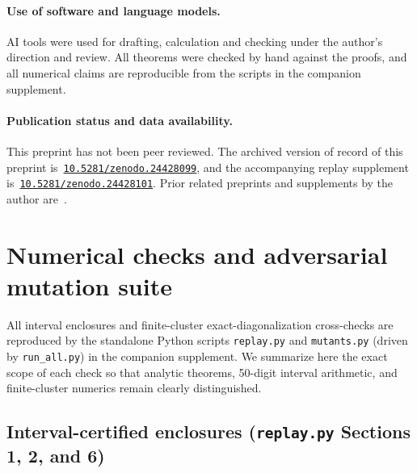 \documentclass[11pt]{article}
\newcommand{\paperdoi}{10.5281/zenodo.24428099}
\newcommand{\suppdoi}{10.5281/zenodo.24428101}
\newcommand{\DOI}[1]{\edef\doival{#1}\mbox{\href{https://doi.org/\doival}{\expandafter\nolinkurl\expandafter{\doival}}}}
\theoremstyle{definition}
\theoremstyle{remark}
\begin{document}
\paragraph{Use of software and language models.}
AI tools were used for drafting, calculation and checking under the author's direction and review. All theorems were checked by hand against the proofs, and all numerical claims are reproducible from the scripts in the companion supplement.

\paragraph{Publication status and data availability.}
This preprint has not been peer reviewed. The archived version of record of this preprint is~\DOI{\paperdoi}, and the accompanying replay supplement is~\DOI{\suppdoi}. Prior related preprints and supplements by the author are~\cite{rens2026eta,rens2026etasupp}.

\appendix

\section{Numerical checks and adversarial mutation suite}\label{app:checks}

All interval enclosures and finite-cluster exact-diagonalization cross-checks are reproduced by the standalone Python scripts \texttt{replay.py} and \texttt{mutants.py} (driven by \texttt{run\_all.py}) in the companion supplement. We summarize here the exact scope of each check so that analytic theorems, 50-digit interval arithmetic, and finite-cluster numerics remain clearly distinguished.

\subsection{Interval-certified enclosures (\texttt{replay.py} Sections 1, 2, and 6)}\label{app:interval}
\end{document}
